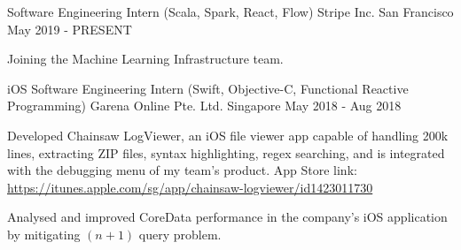 

\begin{cventries}


  \cventry
  {Software Engineering Intern (Scala, Spark, React, Flow)} %
  {Stripe Inc.} %
  {San Francisco} %
  {May 2019 - PRESENT} %
  {
    \begin{cvitems}
      \item {Joining the Machine Learning Infrastructure team.}
    \end{cvitems}
  }

  \cventry
  {iOS Software Engineering Intern (Swift, Objective-C, Functional Reactive Programming)} %
  {Garena Online Pte. Ltd.} %
  {Singapore} %
  {May 2018 - Aug 2018} %
  {
    \begin{cvitems}
    \item {Developed Chainsaw LogViewer, an iOS file viewer app capable of handling 200k lines, extracting ZIP files, syntax highlighting, regex searching, and is integrated with the debugging menu of my team's product. App Store link: \url{https://itunes.apple.com/sg/app/chainsaw-logviewer/id1423011730}}
      \item {Analysed and improved CoreData performance in the company's iOS application by mitigating $(n+1)$ query problem.}
    \end{cvitems}
  }


\end{cventries}
